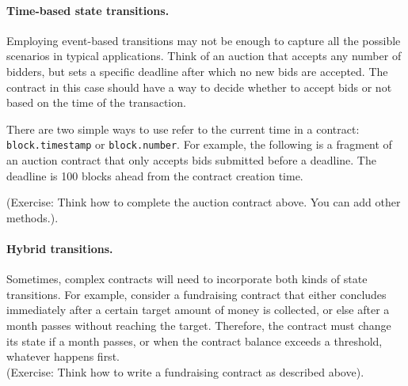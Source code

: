 \documentclass[12pt]{article}
\begin{document}
\paragraph{Time-based state transitions.}
Employing event-based transitions may not be enough to capture all the possible scenarios in typical applications. Think of an auction that accepts any number of bidders, but sets a specific deadline after which no new bids are accepted. The contract in this case should have a way to decide whether to accept bids or not based on the time of the transaction.

There are two simple ways to use refer to the current time in a contract: \texttt{block.timestamp} or \texttt{block.number}. For example, the following is a fragment of an auction contract that only accepts bids submitted before a deadline. The deadline is 100 blocks ahead from the contract creation time.


(Exercise: Think how to complete the auction contract above. You can add other methods.).

\paragraph{Hybrid transitions.}
Sometimes, complex contracts will need to incorporate both kinds of state transitions. For example, consider a fundraising contract that either concludes immediately after a certain target amount of money is collected, or else after a month passes without reaching the target. Therefore, the contract must change its state if a month passes, or when the contract balance exceeds a threshold, whatever happens first.\\

(Exercise: Think how to write a fundraising contract as described above).
\end{document}
